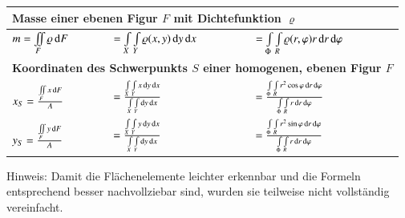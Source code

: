 {\begin{tabular}{|l|l|l|}
        \multicolumn{3}{|l|}{\bf{Masse einer ebenen Figur $F$ mit Dichtefunktion $\varrho$}} \\\hline
        $ m = \iint\limits_{F} \varrho \mathop{} \! \mathrm{d} F $ & 
        $ = \int\limits_{X}\int\limits_{Y} \varrho (x, y) \mathop{} \! \mathrm{d} y \mathop{} \! \mathrm{d} x $ &
        $ = \int\limits_{\Phi}\int\limits_{R} \varrho (r, \varphi) r \mathop{} \! \mathrm{d} r \mathop{} \! \mathrm{d} \varphi $ \\\hline

        \multicolumn{3}{|l|}{\bf{Koordinaten des Schwerpunkts $S$ einer homogenen, ebenen Figur $F$}} \\\hline
        $ x_{S} = \frac{\iint\limits_{F} x \mathop{} \! \mathrm{d} F}{A} $ & 
        $ = \frac{\int\limits_{X}\int\limits_{Y} x \mathop{} \! \mathrm{d} y \mathop{} \! \mathrm{d} x}{\int\limits_{X}\int\limits_{Y} \mathop{} \! \mathrm{d} y \mathop{} \! \mathrm{d} x} $ &
        $ = \frac{\int\limits_{\Phi}\int\limits_{R} r^2 \cos \varphi \mathop{} \! \mathrm{d} r \mathop{} \! \mathrm{d} \varphi}{\int\limits_{\Phi}\int\limits_{R} r \mathop{} \! \mathrm{d} r \mathop{} \! \mathrm{d} \varphi} $ \\
        $ y_{S} = \frac{\iint\limits_{F} y \mathop{} \! \mathrm{d} F}{A} $ & 
        $ = \frac{\int\limits_{X}\int\limits_{Y} y \mathop{} \! \mathrm{d} y \mathop{} \! \mathrm{d} x}{\int\limits_{X}\int\limits_{Y} \mathop{} \! \mathrm{d} y \mathop{} \! \mathrm{d} x} $ &
        $ = \frac{\int\limits_{\Phi}\int\limits_{R} r^2 \sin \varphi \mathop{} \! \mathrm{d} r \mathop{} \! \mathrm{d} \varphi}{\int\limits_{\Phi}\int\limits_{R} r \mathop{} \! \mathrm{d} r \mathop{} \! \mathrm{d} \varphi} $ \\\hline
    \end{tabular}
}

\smallskip
Hinweis: Damit die Flächenelemente leichter erkennbar und die Formeln entsprechend besser nachvollziebar sind, wurden sie teilweise nicht vollständig vereinfacht.


